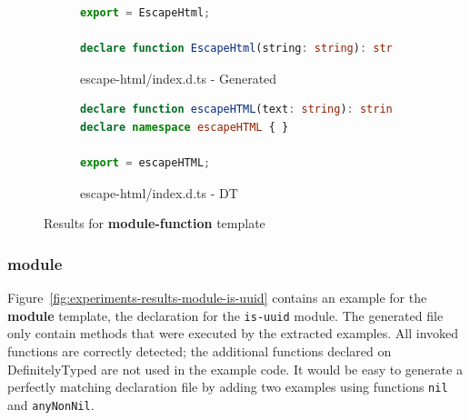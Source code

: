 \documentclass[sigplan,screen]{acmart}
\newcommand{\figref}[1]{Figure~\ref{#1}}
\begin{document}
\begin{figure}[tp]
    \begin{subfigure}[t]{0.48\linewidth}
      \begin{lstlisting}[language=TypeScript,numbers=none]
export = EscapeHtml;

declare function EscapeHtml(string: string): string;

      \end{lstlisting}
      \caption{escape-html/index.d.ts - Generated}
    \end{subfigure}
    \hfill
    \begin{subfigure}[t]{0.48\linewidth}
      \begin{lstlisting}[language=TypeScript,numbers=none]
declare function escapeHTML(text: string): string;
declare namespace escapeHTML { }

export = escapeHTML;
      \end{lstlisting}
      \caption{escape-html/index.d.ts - DT}
    \end{subfigure}

  \caption{Results for \textbf{module-function} template}
  \label{fig:experiments-results-module-function}
\end{figure}

\subsubsection{module}
\figref{fig:experiments-results-module-is-uuid} contains an example
for the \textbf{module} template, the declaration for the \texttt{is-uuid} module.
The generated file only contain methods that were executed by the extracted
examples. All invoked functions are correctly detected; the additional
functions declared on DefinitelyTyped are not used in the example
code.
It would be easy to generate a perfectly matching declaration file by
adding two examples using functions \texttt{nil} and
\texttt{anyNonNil}.
\end{document}
